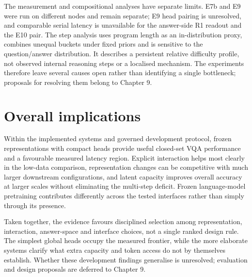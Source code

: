The measurement and compositional analyses have separate limits. E7b and E9
were run on different nodes and remain separate; E9 head pairing is unresolved,
and comparable serial latency is unavailable for the answer-side R1 readout
and the E10 pair. The step analysis uses program length as an in-distribution
proxy, combines unequal buckets under fixed priors and is sensitive to the
question/answer distribution. It describes a persistent relative difficulty
profile, not observed internal reasoning steps or a localised mechanism. The
experiments therefore leave several causes open rather than identifying a
single bottleneck; proposals for resolving them belong to Chapter 9.

\section{Overall implications}
\label{sec:ch8-implications}

Within the implemented systems and governed development protocol, frozen
representations with compact heads provide useful closed-set VQA performance
and a favourable measured latency region. Explicit interaction helps most
clearly in the low-data comparison, representation changes can be competitive
with much larger downstream configurations, and latent capacity improves
overall accuracy at larger scales without eliminating the multi-step deficit.
Frozen language-model pretraining contributes differently across the tested
interfaces rather than simply through its presence.

Taken together, the evidence favours disciplined selection among
representation, interaction, answer-space and interface choices, not a single
ranked design rule. The simplest global heads occupy the measured frontier,
while the more elaborate systems clarify what extra capacity and token access
do not by themselves establish. Whether these development findings generalise
is unresolved; evaluation and design proposals are deferred to Chapter 9.
